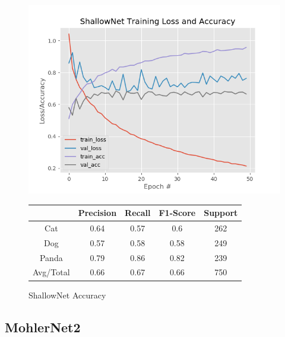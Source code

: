 \documentclass[12pt]{article}
\begin{document}
\begin{figure}[h]
	\centering %
	\captionsetup{justification=centering}
	\begin{minipage}{0.5\textwidth}
		\centering %
		\includegraphics[width=1\textwidth]{BaselineResults_ShallowNet_opt-SGD.png}
		\caption{ShallowNet Accuracy} \label{SN}
	\end{minipage}\hfill
	\begin{minipage}{0.5\textwidth}
		\begin{center}
			\begin{tabular}[5pt]{| c| c| c| c|c|}
				\hline
				& Precision & Recall & F1-Score & Support \\[0.5ex] 
				\hline 	
				Cat   &    0.64	&0.57&	0.6&	262\\ \hline 
				Dog    &   0.57&	0.58&	0.58&	249\\ \hline 
				Panda   &   0.79&	0.86&	0.82&	239	\\ \hline 
				Avg/Total  &     0.66 &	0.67 &	0.66 &	750\\ \hline 
				
			\end{tabular}
			\label{SNR}
		\end{center}	
	\end{minipage}
\end{figure}
\newpage
\subsection{MohlerNet2}
\end{document}
